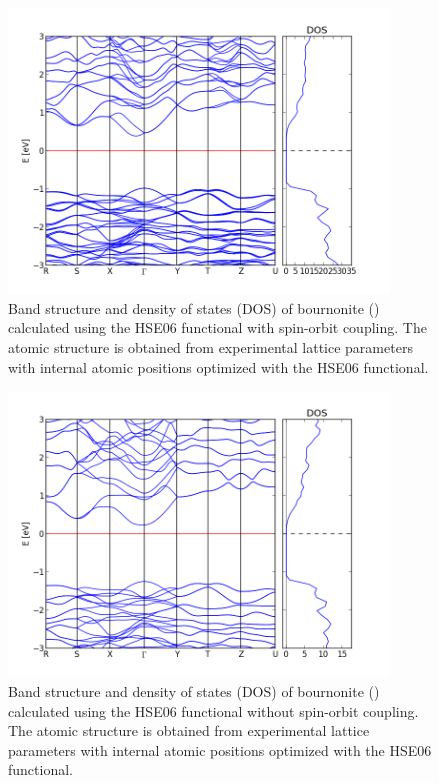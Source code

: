 \begin{figure}[h!]
  \centering
    \includegraphics[width=0.9\textwidth]{figures/bournonite_band_structure.png}
    \caption{Band structure and density of states (DOS) of bournonite ({\bournonite}) calculated using the HSE06 functional with spin-orbit coupling. The atomic structure is obtained from experimental lattice parameters with internal atomic positions optimized with the HSE06 functional.}
  \label{bournonite_band_structure}
\end{figure}

\begin{figure}[h!]
  \centering
    \includegraphics[width=0.9\textwidth]{figures/bournonite_band_structure_no_SOC.png}
    \caption{Band structure and density of states (DOS) of bournonite ({\bournonite}) calculated using the HSE06 functional without spin-orbit coupling. The atomic structure is obtained from experimental lattice parameters with internal atomic positions optimized with the HSE06 functional.}
  \label{bournonite_band_structure_no_SOC}
\end{figure}

